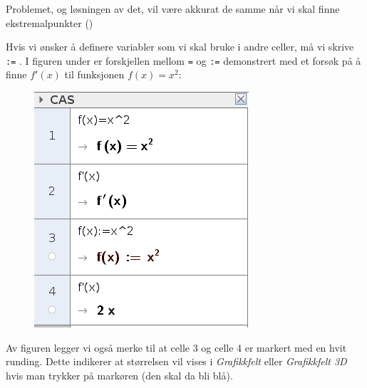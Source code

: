 Problemet, og løsningen av det, vil være akkurat de samme når vi skal finne ekstremalpunkter ()

Hvis vi ønsker å definere variabler som vi skal bruke i andre celler, må vi skrive \texttt{:=} . I figuren under er forskjellen mellom \texttt{=} og \texttt{:=} demonstrert med et forsøk på å finne $ f'(x) $ til funksjonen $ f(x)=x^2 $:
\begin{figure}
	\centering
	\includegraphics[scale=0.5]{fig/fder}
\end{figure}
Av figuren legger vi også merke til at celle 3 og celle 4 er markert med en hvit runding. Dette indikerer at størrelsen vil vises i \textsl{Grafikkfelt} eller \textsl{Grafikkfelt 3D} hvis man trykker på markøren (den skal da bli blå).

